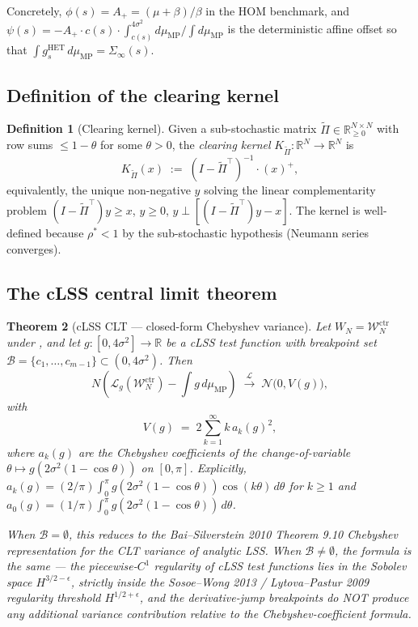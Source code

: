 \documentclass[11pt,a4paper]{article}
\newtheorem{theorem}{Theorem}[section]
\theoremstyle{definition}
\newtheorem{definition}[theorem]{Definition}
\newcommand{\WN}{\mathcal{W}_N^{\mathrm{ctr}}}
\newcommand{\SigmaInf}{\Sigma_\infty}
\newcommand{\rhoStar}{\rho^\ast}
\newcommand{\muMP}{\mu_{\mathrm{MP}}}
\newcommand{\Lcal}{\mathcal{L}}
\newcommand{\Bcal}{\mathcal{B}}
\newcommand{\Kcal}{K_{\widetilde{\Pi}}}
\newcommand{\HET}{\mathrm{HET}}
\begin{document}
Concretely, $\phi(s) = A_+ = (\mu+\beta)/\beta$ in the HOM benchmark, and
$\psi(s) = -A_+\cdot c(s)\cdot\int_{c(s)}^{4\sigma^2}d\muMP/\int d\muMP$ is
the deterministic affine offset so that $\int g_s^{\HET}\,d\muMP = \SigmaInf(s)$.

\subsection{Definition of the clearing kernel}

\begin{definition}[Clearing kernel]
\label{def:clearing-kernel}
Given a sub-stochastic matrix $\widetilde\Pi\in\mathbb{R}^{N\times N}_{\geq 0}$
with row sums $\leq 1-\theta$ for some $\theta>0$, the \emph{clearing kernel}
$\Kcal:\mathbb{R}^N\to\mathbb{R}^N$ is
\[
\Kcal(x)\;:=\;(I - \widetilde\Pi^\top)^{-1}\cdot(x)^+,
\]
equivalently, the unique non-negative $y$ solving the linear complementarity
problem $(I - \widetilde\Pi^\top)y\geq x$, $y\geq 0$,
$y\perp[(I - \widetilde\Pi^\top)y - x]$. The kernel is well-defined because
$\rhoStar<1$ by the sub-stochastic hypothesis (Neumann series converges).
\end{definition}

\subsection{The cLSS central limit theorem}

\begin{theorem}[cLSS CLT --- closed-form Chebyshev variance]
\label{thm:cLSS-CLT}
Let $W_N = \WN$ under , and let
$g:[0,4\sigma^2]\to\mathbb{R}$ be a cLSS test function with breakpoint set
$\Bcal = \{c_1,\dots,c_{m-1}\}\subset(0,4\sigma^2)$. Then
\[
N\!\left(\Lcal_g(\WN) - \int g\,d\muMP\right)\;\xrightarrow{\mathcal L}\;
\mathcal N\!\bigl(0,V(g)\bigr),
\]
with
\[
V(g)\;=\;2\sum_{k=1}^\infty k\,a_k(g)^2,
\]
where $a_k(g)$ are the Chebyshev coefficients of the change-of-variable
$\theta\mapsto g(2\sigma^2(1-\cos\theta))$ on $[0,\pi]$. Explicitly,
$a_k(g) = (2/\pi)\int_0^\pi g(2\sigma^2(1-\cos\theta))\cos(k\theta)\,d\theta$
for $k\geq 1$ and $a_0(g) = (1/\pi)\int_0^\pi g(2\sigma^2(1-\cos\theta))\,d\theta$.

When $\Bcal = \emptyset$, this reduces to the Bai--Silverstein 2010
Theorem 9.10 Chebyshev representation for the CLT variance of analytic LSS.
When $\Bcal\neq\emptyset$, the formula is the same --- the piecewise-$C^1$
regularity of cLSS test functions lies in the Sobolev space
$H^{3/2-\epsilon}$, strictly inside the Sosoe--Wong 2013 / Lytova--Pastur 2009
regularity threshold $H^{1/2+\epsilon}$, and the derivative-jump breakpoints
do NOT produce any additional variance contribution relative to the
Chebyshev-coefficient formula.
\end{theorem}
\end{document}
